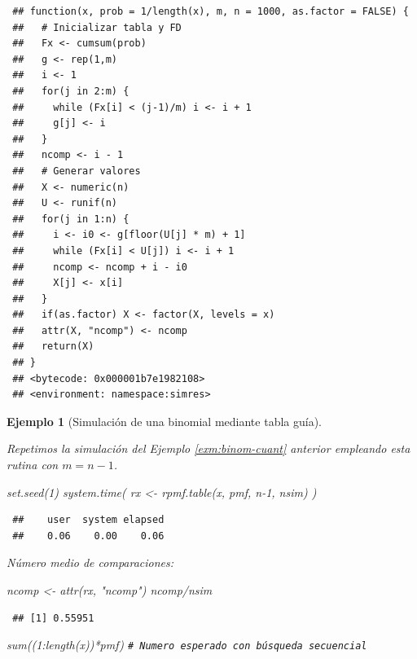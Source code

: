 \documentclass[
]{book}
\newenvironment{Shaded}{\begin{snugshade}}{\end{snugshade}}
\newcommand{\CommentTok}[1]{\textcolor[rgb]{0.56,0.35,0.01}{\textit{#1}}}
\newcommand{\DecValTok}[1]{\textcolor[rgb]{0.00,0.00,0.81}{#1}}
\newcommand{\FunctionTok}[1]{\textcolor[rgb]{0.00,0.00,0.00}{#1}}
\newcommand{\NormalTok}[1]{#1}
\newcommand{\OtherTok}[1]{\textcolor[rgb]{0.56,0.35,0.01}{#1}}
\newcommand{\SpecialCharTok}[1]{\textcolor[rgb]{0.00,0.00,0.00}{#1}}
\newcommand{\StringTok}[1]{\textcolor[rgb]{0.31,0.60,0.02}{#1}}
\theoremstyle{break}
\newtheorem{example}{Ejemplo}[chapter]
\theoremstyle{nonumberplain}
\renewcommand{\CommentTok}[1]{\textcolor[rgb]{0.41,0.41,0.41}{\texttt{#1}}}
\begin{document}
\begin{verbatim}
 ## function(x, prob = 1/length(x), m, n = 1000, as.factor = FALSE) {
 ##   # Inicializar tabla y FD
 ##   Fx <- cumsum(prob)
 ##   g <- rep(1,m)
 ##   i <- 1
 ##   for(j in 2:m) {
 ##     while (Fx[i] < (j-1)/m) i <- i + 1
 ##     g[j] <- i
 ##   }
 ##   ncomp <- i - 1
 ##   # Generar valores
 ##   X <- numeric(n)
 ##   U <- runif(n)
 ##   for(j in 1:n) {
 ##     i <- i0 <- g[floor(U[j] * m) + 1]
 ##     while (Fx[i] < U[j]) i <- i + 1
 ##     ncomp <- ncomp + i - i0
 ##     X[j] <- x[i]
 ##   }
 ##   if(as.factor) X <- factor(X, levels = x)
 ##   attr(X, "ncomp") <- ncomp
 ##   return(X)
 ## }
 ## <bytecode: 0x000001b7e1982108>
 ## <environment: namespace:simres>
\end{verbatim}

\begin{example}[Simulación de una binomial mediante tabla guía]
\protect\hypertarget{exm:binom-tabla}{}\label{exm:binom-tabla}

Repetimos la simulación del Ejemplo \ref{exm:binom-cuant} anterior empleando esta rutina con \(m=n-1\).

\begin{Shaded}
\begin{Highlighting}[]
\FunctionTok{set.seed}\NormalTok{(}\DecValTok{1}\NormalTok{)}
\FunctionTok{system.time}\NormalTok{( rx }\OtherTok{\textless{}{-}} \FunctionTok{rpmf.table}\NormalTok{(x, pmf, n}\DecValTok{{-}1}\NormalTok{, nsim) )}
\end{Highlighting}
\end{Shaded}

\begin{verbatim}
 ##    user  system elapsed 
 ##    0.06    0.00    0.06
\end{verbatim}

Número medio de comparaciones:

\begin{Shaded}
\begin{Highlighting}[]
\NormalTok{ncomp }\OtherTok{\textless{}{-}} \FunctionTok{attr}\NormalTok{(rx, }\StringTok{"ncomp"}\NormalTok{)}
\NormalTok{ncomp}\SpecialCharTok{/}\NormalTok{nsim}
\end{Highlighting}
\end{Shaded}

\begin{verbatim}
 ## [1] 0.55951
\end{verbatim}

\begin{Shaded}
\begin{Highlighting}[]
\FunctionTok{sum}\NormalTok{((}\DecValTok{1}\SpecialCharTok{:}\FunctionTok{length}\NormalTok{(x))}\SpecialCharTok{*}\NormalTok{pmf) }\CommentTok{\# Numero esperado con búsqueda secuencial}
\end{Highlighting}
\end{Shaded}


\end{example}
\end{document}
